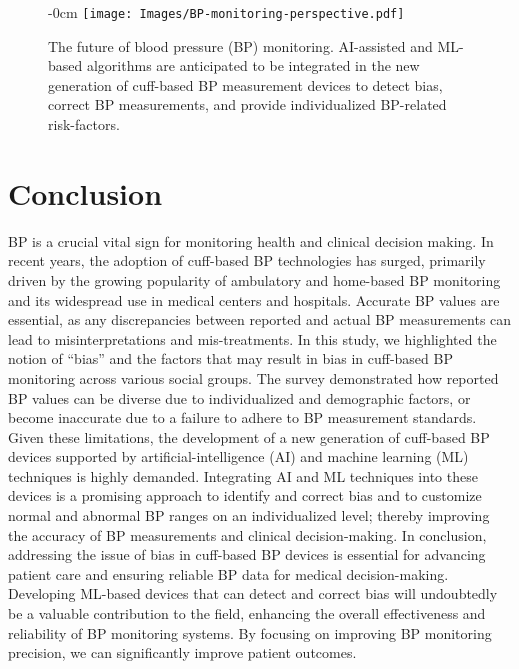 \documentclass[journal,article,moreauthors]{Definitions/mdpi}
\begin{document}
\begin{figure}[tb]
\begin{adjustwidth}{-\extralength}{0cm}
\centering
\texttt{[image: Images/BP-monitoring-perspective.pdf]}
\caption{The future of blood pressure (BP) monitoring. AI-assisted and ML-based algorithms are anticipated to be integrated in the new generation of cuff-based BP measurement devices to detect bias, correct BP measurements, and provide individualized BP-related risk-factors.}\label{Fig: CorrectedBP}
\end{adjustwidth}
\end{figure}


\section{Conclusion}\label{sec: conclusion}
BP is a crucial vital sign for monitoring health and clinical decision making. In recent years, the adoption of cuff-based BP technologies has surged, primarily driven by the growing popularity of ambulatory and home-based BP monitoring and its widespread use in medical centers and hospitals. Accurate BP values are essential, as any discrepancies between reported and actual BP measurements can lead to misinterpretations and mis-treatments. In this study, we highlighted the notion of ``bias'' and the factors that may result in bias in cuff-based BP monitoring across various social groups. The survey demonstrated how reported BP values can be diverse due to individualized and demographic factors, or become inaccurate due to a failure to adhere to BP measurement standards. Given these limitations, the development of a new generation of cuff-based BP devices supported by artificial-intelligence (AI) and machine learning (ML) techniques is highly demanded. Integrating AI and ML techniques into these devices is a promising approach to identify and correct bias and to customize normal and abnormal BP ranges on an individualized level; thereby improving the accuracy of BP measurements and clinical decision-making. In conclusion, addressing the issue of bias in cuff-based BP devices is essential for advancing patient care and ensuring reliable BP data for medical decision-making. Developing ML-based devices that can detect and correct bias will undoubtedly be a valuable contribution to the field, enhancing the overall effectiveness and reliability of BP monitoring systems. By focusing on improving BP monitoring precision, we can significantly improve patient outcomes.
\end{document}
